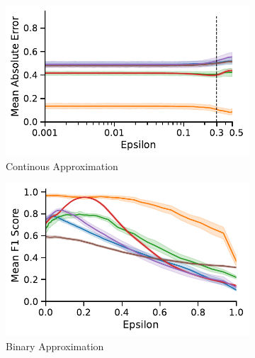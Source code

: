 \begin{figure}[!htb]
	\centering
	\begin{subfigure}[t]{0.39\textwidth}
		\centering
		\includegraphics[width=\textwidth]{Figures/global_error_1_b.pdf}
		\caption{Continous Approximation}
		\label{fig:approx_error}
	\end{subfigure}
	\hfill
	\begin{subfigure}[t]{0.39\textwidth}
		\centering
		\includegraphics[width=\textwidth]{Figures/global_error_2_b.pdf}
		\caption{Binary Approximation}
		\label{fig:approx_error_f1}
	\end{subfigure}
	\hfill
	\begin{subfigure}[t]{0.2\textwidth}
		\centering
		\raisebox{22pt}{
}
\end{subfigure}
\end{figure}
